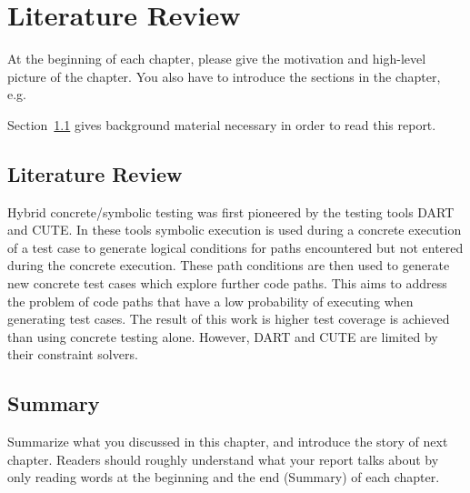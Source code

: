 \chapter{Literature Review}
\label{cha:literature_review}

At the beginning of each chapter, please give the motivation and
high-level picture of the chapter. You also have to introduce the sections
in the chapter, e.g.\

  Section~\ref{sec:literature_review} gives background material necessary in
  order to read this report.

  
\section{Literature Review}
\label{sec:literature_review}
Hybrid concrete/symbolic testing was first pioneered by the testing tools DART and CUTE. In these tools symbolic execution is used during a concrete execution of a test case to generate logical conditions for paths encountered but not entered during the concrete execution. These path conditions are then used to generate new concrete test cases which explore further code paths. This aims to address the problem of code paths that have a low probability of executing when generating test cases. The result of this work is higher test coverage is achieved than using concrete testing alone. However, DART and CUTE are limited by their constraint solvers.


\section{Summary}

Summarize what you discussed in this chapter, and introduce the story
of next chapter. Readers should roughly understand what your report
talks about by only reading words at the beginning and the end
(Summary) of each chapter.


